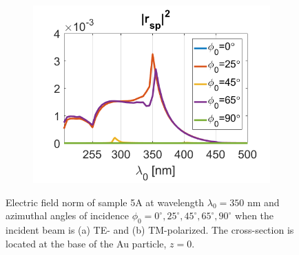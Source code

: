 \begin{figure}[htb!]
\begin{subfigure}{0.32\textwidth}
        \centering
        \includegraphics[width=\linewidth]{figures/ch4/S5A/FieldDistribution/phi0-90/S5A_rsp_phi0-90.png}
   \end{subfigure}
   \vspace{0.7cm}
   \caption{Electric field norm of sample 5A at wavelength $\lambda_0=350$ nm and azimuthal angles of incidence $\phi_0=0^\circ, 25^\circ, 45^\circ, 65^\circ, 90^\circ$ when the incident beam is (a) TE- and (b) TM-polarized. The cross-section is located at the base of the Au particle, $z=0$.}
   \label{fig:S5A_normE_phi0-90_wl350}   
\end{figure}












\clearpage
